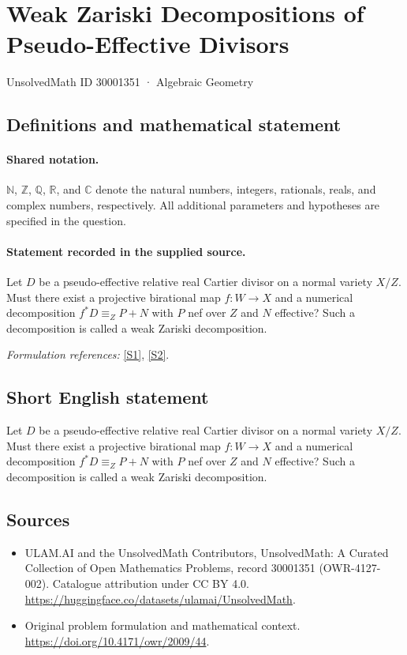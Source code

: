 \documentclass[11pt]{article}
\newcommand{\sref}[2]{\hyperlink{source:#1:#2}{[S#2]}}
\begin{document}
\setcounter{section}{30001350}
\section{Weak Zariski Decompositions of Pseudo-Effective Divisors}\label{30001351}
{\small UnsolvedMath ID 30001351 · Algebraic Geometry}
\subsection{Definitions and mathematical statement}

\paragraph{Shared notation.}$\mathbb N$, $\mathbb Z$, $\mathbb Q$, $\mathbb R$, and $\mathbb C$ denote the natural numbers, integers, rationals, reals, and complex numbers, respectively. All additional parameters and hypotheses are specified in the question.


\paragraph{Statement recorded in the supplied source.}
Let $D$ be a pseudo-effective relative real Cartier divisor on a normal variety $X/Z$. Must there exist a projective birational map $f:W\to X$ and a numerical decomposition $f^*D\equiv_Z P+N$ with $P$ nef over $Z$ and $N$ effective? Such a decomposition is called a weak Zariski decomposition.
\par\smallskip\textit{Formulation references:} \sref{30001351}{1}, \sref{30001351}{2}.
\subsection{Short English statement}
Let $D$ be a pseudo-effective relative real Cartier divisor on a normal variety $X/Z$. Must there exist a projective birational map $f:W\to X$ and a numerical decomposition $f^*D\equiv_Z P+N$ with $P$ nef over $Z$ and $N$ effective? Such a decomposition is called a weak Zariski decomposition.
\subsection{Sources}
\begin{itemize}
\item[\hypertarget{source:30001351:1}{S1}] ULAM.AI and the UnsolvedMath Contributors, UnsolvedMath: A Curated Collection of Open Mathematics Problems, record 30001351 (OWR-4127-002). Catalogue attribution under CC BY 4.0.
\url{https://huggingface.co/datasets/ulamai/UnsolvedMath}.
\item[\hypertarget{source:30001351:2}{S2}] Original problem formulation and mathematical context.
\url{https://doi.org/10.4171/owr/2009/44}.
\end{itemize}
\label{end:30001351}
\end{document}
